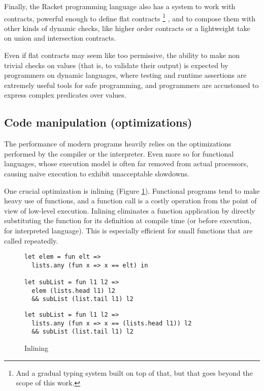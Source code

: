 \documentclass[sigplan,10pt,review,anonymous]{acmart}
\newcommand{\info}[2][1=]{}
\begin{document}
Finally, the Racket programming language also has a system to work with
contracts, powerful enough to define flat contracts
\footnote{And a gradual typing system
built on top of that, but that goes beyond the scope of this
work.}
, and
to compose them with other kinds of dynamic checks,
like higher order contracts or a lightweight take on union
and intersection contracts\cite{RacketContracts}.

Even if flat contracts may seem like too permissive, the ability to make
non trivial checks on values (that is, to validate their output) is expected
by programmers on dynamic languages, where testing and runtime
assertions are extremely useful tools for safe programming, and
programmers are accustomed to express complex predicates
over values.


\subsection*{Code manipulation (optimizations)}
\label{sec:optimizations}
\info{Present inlining and CSE as two major code
optimizations.
Purity and immutability as two important factors.}

The performance of modern programs heavily relies on the optimizations performed
by the compiler or the interpreter. Even more so for functional languages, whose
execution model is often far removed from actual processors, causing naive
execution to exhibit unacceptable slowdowns.

One crucial optimization is
inlining (Figure \ref{fig:optimizations-inlining-ex}). Functional programs tend
to make heavy use of functions, and a function call is a costly operation from
the point of view of low-level execution. Inlining eliminates a function
application by directly substituting the function for its definition at compile
time (or before execution, for interpreted language). This is especially
efficient for small functions that are called repeatedly.

\info{I think it's better to use [h] on figures, we can discuss it}
\begin{figure}[h]
  \begin{center}
\begin{lstlisting}[language=nickel,title={Source program}]
let elem = fun elt =>
  lists.any (fun x => x == elt) in

let subList = fun l1 l2 =>
  elem (lists.head l1) l2
  && subList (list.tail l1) l2
\end{lstlisting}
\begin{lstlisting}[language=nickel,title={Optimized program}]
let subList = fun l1 l2 =>
  lists.any (fun x => x == (lists.head l1)) l2
  && subList (list.tail l1) l2
\end{lstlisting}
  \end{center}
\caption{Inlining}
\label{fig:optimizations-inlining-ex}
\end{figure}
\end{document}
